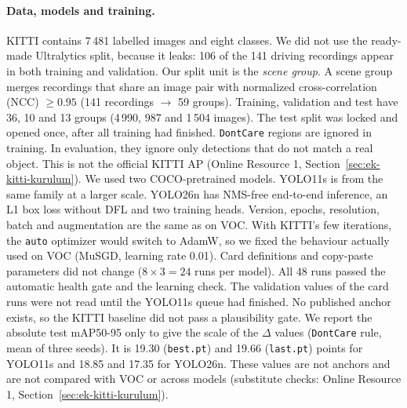 \documentclass[pdflatex,iicol,sn-mathphys-num]{sn-jnl}
\begin{document}
\paragraph{Data, models and training.}
KITTI \cite{geiger_2012_kitti} contains 7\,481 labelled images and eight classes. We did not use the ready-made Ultralytics split, because it leaks: 106 of the 141 driving recordings appear in both training and validation. Our split unit is the \emph{scene group}. A scene group merges recordings that share an image pair with normalized cross-correlation (NCC) $\ge0.95$ (141 recordings $\to$ 59 groups). Training, validation and test have 36, 10 and 13 groups (4\,990, 987 and 1\,504 images). The test split was locked and opened once, after all training had finished. \texttt{DontCare} regions are ignored in training. In evaluation, they ignore only detections that do not match a real object. This is not the official KITTI AP (Online Resource 1, Section~\ref{sec:ek-kitti-kurulum}). We used two COCO-pretrained models. YOLO11s is from the same family at a larger scale. YOLO26n \cite{jocher_2026_yolo26} has NMS-free end-to-end inference, an L1 box loss without DFL and two training heads. Version, epochs, resolution, batch and augmentation are the same as on VOC. With KITTI's few iterations, the \texttt{auto} optimizer would switch to AdamW, so we fixed the behaviour actually used on VOC (MuSGD, learning rate 0.01). Card definitions and copy-paste parameters did not change ($8\times3=24$ runs per model). All 48 runs passed the automatic health gate and the learning check. The validation values of the card runs were not read until the YOLO11s queue had finished. No published anchor exists, so the KITTI baseline did not pass a plausibility gate. We report the absolute test mAP50-95 only to give the scale of the $\Delta$ values (\texttt{DontCare} rule, mean of three seeds). It is 19.30 (\texttt{best.pt}) and 19.66 (\texttt{last.pt}) points for YOLO11s and 18.85 and 17.35 for YOLO26n. These values are not anchors and are not compared with VOC or across models (substitute checks: Online Resource 1, Section~\ref{sec:ek-kitti-kurulum}).
\end{document}
